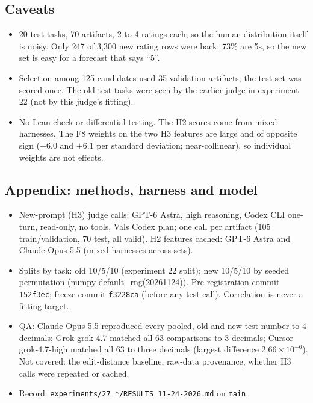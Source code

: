 \subsection*{Caveats}
\begin{itemize}
  \item 20 test tasks, 70 artifacts, 2 to 4 ratings each, so the human distribution itself is noisy. Only 247 of 3,300 new rating rows were back; 73\% are 5s, so the new set is easy for a forecast that says ``5''.
  \item Selection among 125 candidates used 35 validation artifacts; the test set was scored once. The old test tasks were seen by the earlier judge in experiment 22 (not by this judge's fitting).
  \item No Lean check or differential testing. The H2 scores come from mixed harnesses. The F8 weights on the two H3 features are large and of opposite sign ($-6.0$ and $+6.1$ per standard deviation; near-collinear), so individual weights are not effects.
\end{itemize}

\subsection*{Appendix: methods, harness and model}
\begin{itemize}
  \item New-prompt (H3) judge calls: GPT-6 Astra, high reasoning, Codex CLI one-turn, read-only, no tools, Vals Codex plan; one call per artifact (105 train/validation, 70 test, all valid). H2 features cached: GPT-6 Astra and Claude Opus 5.5 (mixed harnesses across sets).
  \item Splits by task: old 10/5/10 (experiment 22 split); new 10/5/10 by seeded permutation (numpy default\_rng(20261124)). Pre-registration commit \texttt{152f3ec}; freeze commit \texttt{f3228ca} (before any test call). Correlation is never a fitting target.
  \item QA: Claude Opus 5.5 reproduced every pooled, old and new test number to 4 decimals; Grok grok-4.7 matched all 63 comparisons to 3 decimals; Cursor grok-4.7-high matched all 63 to three decimals (largest difference $2.66\times10^{-6}$). Not covered: the edit-distance baseline, raw-data provenance, whether H3 calls were repeated or cached.
  \item Record: \texttt{experiments/27\_*/RESULTS\_11-24-2026.md} on \texttt{main}.
\end{itemize}

